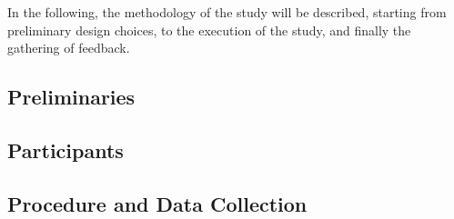 In the following, the methodology of the study will be described, starting from preliminary design choices, to the execution of the study, and finally the gathering of feedback.

\subsection{\label{sec::Preliminaries}Preliminaries}

\subsection{\label{sec::Participants}Participants}

\subsection{\label{sec::Execution}Procedure and Data Collection}
